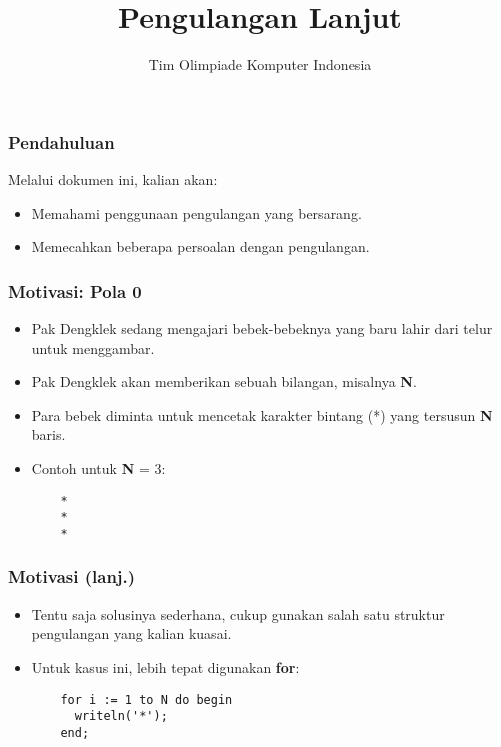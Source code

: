 

\title{Pengulangan Lanjut}
\author{Tim Olimpiade Komputer Indonesia}
\date{}



\begin{frame}
\titlepage
\end{frame}

\begin{frame}
\frametitle{Pendahuluan}
Melalui dokumen ini, kalian akan:
\begin{itemize}
  \item Memahami penggunaan pengulangan yang bersarang.
  \item Memecahkan beberapa persoalan dengan pengulangan.
\end{itemize}
\end{frame}

\begin{frame}[fragile]
\frametitle{Motivasi: Pola 0}
\begin{itemize}
  \item Pak Dengklek sedang mengajari bebek-bebeknya yang baru lahir dari telur untuk menggambar.
  \item Pak Dengklek akan memberikan sebuah bilangan, misalnya \textbf{N}.
  \item Para bebek diminta untuk mencetak karakter bintang (*) yang tersusun \textbf{N} baris.
  \item Contoh untuk \textbf{N} = 3:
  \begin{lstlisting}
    *
    *
    *
  \end{lstlisting}
\end{itemize}
\end{frame}

\begin{frame}[fragile]
\frametitle{Motivasi (lanj.)}
\begin{itemize}
  \item Tentu saja solusinya sederhana, cukup gunakan salah satu struktur pengulangan yang kalian kuasai.
  \item Untuk kasus ini, lebih tepat digunakan \textbf{for}:
  \begin{lstlisting}
    for i := 1 to N do begin
      writeln('*');
    end;
  \end{lstlisting}
\end{itemize}
\end{frame}

